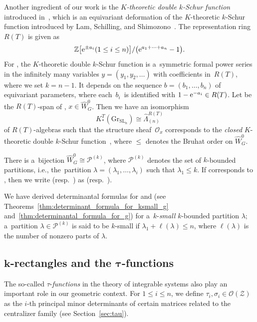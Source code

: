 \documentclass[pdftex]{sigma}
\numberwithin{equation}{section}
\newcommand{\Gr}{\mathrm{Gr}}
\newcommand{\la}{\lambda}
\newcommand{\Rep}{{R(T)}}
\newcommand{\SL}{\mathrm{SL}}
\newcommand{\Z}{\mathbb{Z}}
\theoremstyle{definition}
\begin{document}
Another ingredient of
our work is the \emph{$K$-theoretic double $k$-Schur function} introduced in~\cite{ISY}, which is an equivariant deformation of the $K$-theoretic $k$-Schur function introduced by Lam, Schilling, and Shimozono~\cite{LSS:K}.
The representation ring $\Rep$ is given as
\[
\Z\big[{\rm e}^{\pm a_i} (1\le i\le n)\big]/\bigl({\rm e}^{a_1+\cdots+a_n}-1\bigr).
\]
For , the $K$-theoretic double $k$-Schur function  is a~symmetric formal power series in the infinitely many variables $y=(y_1,y_2,\dots)$ with coefficients in~$\Rep$, where we set $k=n-1$.
It depends on the sequence $b=(b_1,\dots,b_n)$ of equivariant parameters, where each~$b_i$~is identified
with $1-{\rm e}^{-a_i}\in \Rep$.
 Let \smash{$\hat{\Lambda}^{\Rep}_{(n)}$} be the $\Rep$-span of , $
 x\in \hat{W}_G^0$. Then we have an isomorphism
\[
 K_*^T(\Gr_{\SL_n})\cong \hat{\Lambda}^{\Rep}_{(n)}
\]
 of $\Rep$-algebras such that the structure sheaf~$\mathscr{O}_x$ corresponds to the \emph{closed} $K$-theoretic double $k$-Schur function~, where $\le $ denotes
 the Bruhat order on $\hat{W}_G^0$.

There is a~bijection $\hat{W}_G^0\cong \mathscr{P}^{(k)}$, where
$\mathscr{P}^{(k)}$ denotes the set of $k$-bounded partitions, i.e., the~partition $\la=(\la_1,\dots,\la_i)$ such that
$\la_1\le k$.
If  corresponds to
\smash{$\la\in \mathscr{P}^{(k)}$},
then we write  \big(resp.\ \big)
as \smash{$g_\la^{(k)}(y|b)$} \big(resp.\ \smash{$\tilde{g}_\la^{(k)}(y|b)$}\big).

We have derived determinantal formulas for
\smash{$g^{(k)}_\la(y|b)$} and \smash{$\tilde{g}_\la^{(k)}(y|b)$} (see Theorems~\ref{thm:determinant_formula_for_ksmall_g} and~\ref{thm:determinantal_formula_for_g})
for a~$k$-\emph{small} $k$-bounded partition $\la$; a~partition $\la\in \mathscr{P}^{(k)}$ is said to be $k$-small if $\la_1+\ell(\la)\le n$, where
$\ell(\la)$ is the number of nonzero parts of $\la$.

\subsection[k-rectangles and the tau-functions]{$\boldsymbol{k}$-rectangles and the $\boldsymbol{\tau}$-functions}
The so-called $\tau$-\emph{functions} in the theory of integrable systems also play an important role in our geometric context. For $1\le i\le n$, we define
$\tau_i,\sigma_i\in \mathscr{O}(\mathscr{Z})$ as the $i$-th principal minor determinants of certain matrices
related to the centralizer family (see Section~\ref{sec:tau}).
\end{document}
